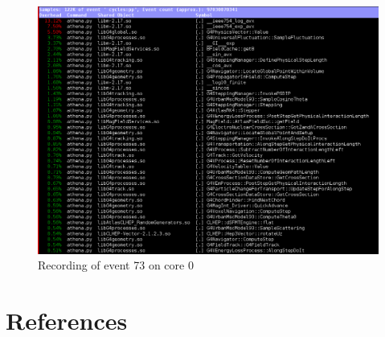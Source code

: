 \documentclass[a4paper]{jpconf}
\begin{document}
\begin{figure}[h]
\begin{center}
\includegraphics[scale=0.45]{images/Event73_Processor0.png}
\end{center}
\caption{\label{event-73-processor9} Recording of event 73 on core 0}
\end{figure}

\section*{References}


\end{document}
